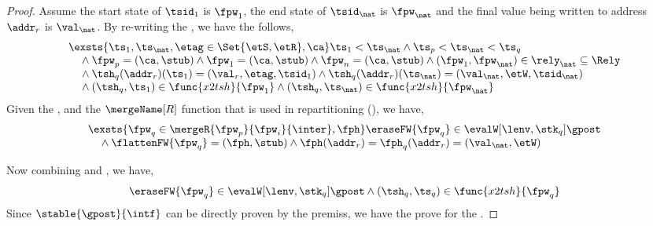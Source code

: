 \begin{proof}
Assume the start state of \( \tsid_{1} \) is \( \fpw_{1} \), the end state of \( \tsid_{\nat} \) is \( \fpw_{\nat} \) and the final value being written to address \( \addr_{r} \) is \( \val_{\nat} \).
By re-writing the , we have the follows,
\begin{equation}
    \label{equ:first-and-last-concurrent-trans}
    \begin{array}{@{}l@{}}
        \exsts{ \ts_{1}, \ts_{\nat}, \etag \in \Set{\etS, \etR}, \ca }
        \ts_{1} < \ts_{\nat}
        \land \ts_{p} < \ts_{\nat} < \ts_{q}  \\
        \quad {} \land \fpw_{p} = (\ca, \stub) 
        \land \fpw_{1} = (\ca, \stub)  
        \land \fpw_{n} = (\ca, \stub) 
        \land (\fpw_{1}, \fpw_{\nat}) \in \rely_{\nat} \subseteq \Rely \\
        \quad {} \land \tsh_{q}(\addr_{r})(\ts_{1}) = (\val_{r}, \etag, \tsid_{1}) 
        \land \tsh_{q}(\addr_{r})(\ts_{\nat}) = (\val_{\nat}, \etW, \tsid_{\nat})  \\
        \quad {} \land (\tsh_{q}, \ts_{1}) \in \func{x2tsh}{\fpw_{1}}
        \land (\tsh_{q}, \ts_{\nat}) \in \func{x2tsh}{\fpw_{\nat}}
    \end{array}
\end{equation}
Given the  , and the \( \mergeName[R] \) function that is used in repartitioning (), we have,
\begin{equation}
\label{equ:read-can-be-merged}
    \begin{array}{@{}l@{}}
      \exsts{ \fpw_{q} \in \mergeR{\fpw_{p}}{\fpw_{i}}{\inter}, \fph }  
      \eraseFW{\fpw_{q}} \in \evalW[\lenv, \stk_{q}]{\gpost} \\
      \quad {} \land \flattenFW{\fpw_{q}} = (\fph, \stub) \land \fph(\addr_{r}) = \fph_{q}(\addr_{r}) = (\val_{\nat}, \etW)
    \end{array}
\end{equation}

Now combining  and , we have, 
\begin{equation}
    \eraseFW{\fpw_{q}} \in \evalW[\lenv, \stk_{q}]{\gpost}
    \land (\tsh_{q}, \ts_{q}) \in \func{x2tsh}{\fpw_{q}}  \\
\end{equation}
Since \( \stable{\gpost}{\intf} \) can be directly proven by the premiss, we have the prove for the .


\end{proof}










